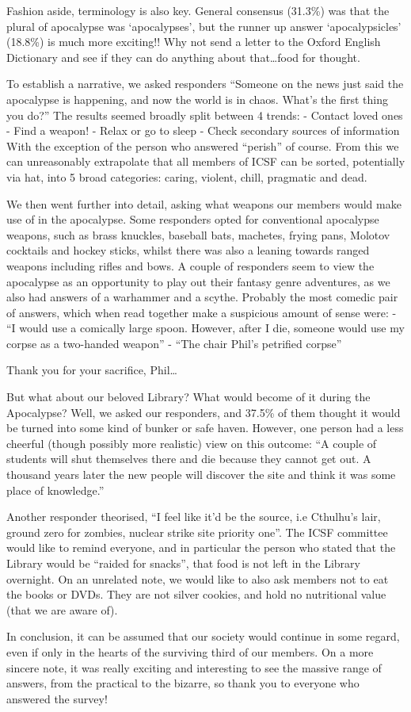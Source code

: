 Fashion aside, terminology is also key. General consensus (31.3\%) was that the plural of apocalypse was ‘apocalypses’, but the runner up answer ‘apocalypsicles’ (18.8\%) is much more exciting!! Why not send a letter to the Oxford English Dictionary and see if they can do anything about that…food for thought.

To establish a narrative, we asked responders “Someone on the news just said the apocalypse is happening, and now the world is in chaos. What's the first thing you do?”
The results seemed broadly split between 4 trends:
-	Contact loved ones
-	Find a weapon!
-	Relax or go to sleep 
-	Check secondary sources of information
With the exception of the person who answered “perish” of course. From this we can unreasonably extrapolate that all members of ICSF can be sorted, potentially via hat, into 5 broad categories: caring, violent, chill, pragmatic and dead.

We then went further into detail, asking what weapons our members would make use of in the apocalypse. Some responders opted for conventional apocalypse weapons, such as brass knuckles, baseball bats, machetes, frying pans, Molotov cocktails and hockey sticks, whilst there was also a leaning towards ranged weapons including rifles and bows. A couple of responders seem to view the apocalypse as an opportunity to play out their fantasy genre adventures, as we also had answers of a warhammer and a scythe. Probably the most comedic pair of answers, which when read together make a suspicious amount of sense were:
-	“I would use a comically large spoon. However, after I die, someone would use my corpse as a two-handed weapon”
-	“The chair Phil’s petrified corpse”

Thank you for your sacrifice, Phil…

But what about our beloved Library? What would become of it during the Apocalypse? Well, we asked our responders, and 37.5\% of them thought it would be turned into some kind of bunker or safe haven. However, one person had a less cheerful (though possibly more realistic) view on this outcome:
“A couple of students will shut themselves there and die because they cannot get out. A thousand years later the new people will discover the site and think it was some place of knowledge.”

Another responder theorised, “I feel like it'd be the source, i.e Cthulhu's lair, ground zero for zombies, nuclear strike site priority one”.
The ICSF committee would like to remind everyone, and in particular the person who stated that the Library would be “raided for snacks”, that food is not left in the Library overnight. On an unrelated note, we would like to also ask members not to eat the books or DVDs. They are not silver cookies, and hold no nutritional value (that we are aware of).

In conclusion, it can be assumed that our society would continue in some regard, even if only in the hearts of the surviving third of our members. On a more sincere note, it was really exciting and interesting to see the massive range of answers, from the practical to the bizarre, so thank you to everyone who answered the survey! 
